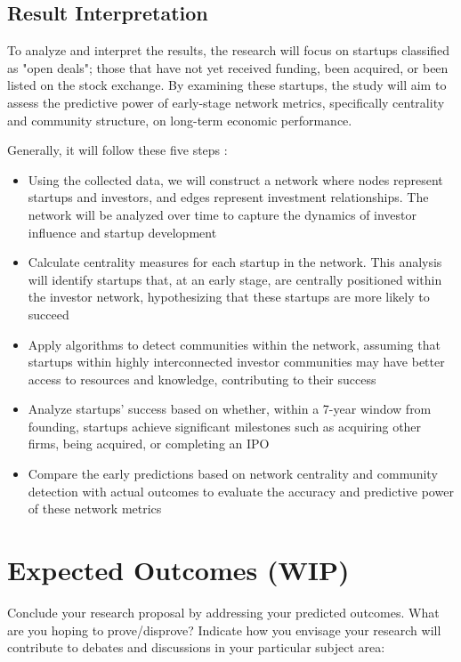 \documentclass[a4paper,11pt]{article}
\begin{document}
\subsection{Result Interpretation}
To analyze and interpret the results, the research will focus on startups classified as "open deals"; those that have not yet received funding, been acquired, or been listed on the stock exchange. By examining these startups, the study will aim to assess the predictive power of early-stage network metrics, specifically centrality and community structure, on long-term economic performance.

Generally, it will follow these five steps : 
\begin{itemize}
    \item Using the collected data, we will construct a network where nodes represent startups and investors, and edges represent investment relationships. The network will be analyzed over time to capture the dynamics of investor influence and startup development
    \item Calculate centrality measures for each startup in the network. This analysis will identify startups that, at an early stage, are centrally positioned within the investor network, hypothesizing that these startups are more likely to succeed
    \item Apply algorithms to detect communities within the network, assuming that startups within highly interconnected investor communities may have better access to resources and knowledge, contributing to their success
    \item Analyze startups' success based on whether, within a 7-year window from founding, startups achieve significant milestones such as acquiring other firms, being acquired, or completing an IPO
    \item Compare the early predictions based on network centrality and community detection with actual outcomes to evaluate the accuracy and predictive power of these network metrics
\end{itemize}

\section{Expected Outcomes (WIP)}

Conclude your research proposal by addressing your predicted outcomes. What are you hoping to prove/disprove? Indicate how you envisage your research will contribute to debates and discussions in your particular subject area:
\end{document}
